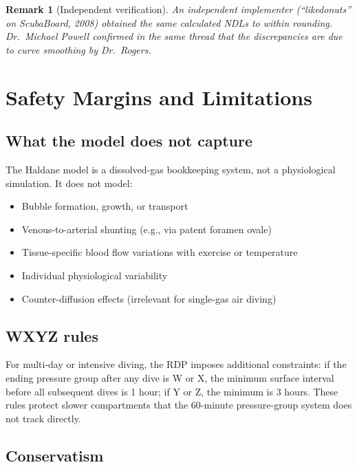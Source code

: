\documentclass[11pt,letterpaper]{article}
\newtheorem{remark}{Remark}
\begin{document}
\begin{remark}[Independent verification]
An independent implementer (``likedonuts'' on ScubaBoard, 2008) obtained
the same calculated NDLs to within rounding.  Dr.~Michael Powell confirmed
in the same thread that the discrepancies are due to curve smoothing by
Dr.~Rogers.
\end{remark}


\section{Safety Margins and Limitations}

\subsection{What the model does not capture}

The Haldane model is a dissolved-gas bookkeeping system, not a physiological
simulation.  It does not model:
\begin{itemize}[nosep]
  \item Bubble formation, growth, or transport
  \item Venous-to-arterial shunting (e.g., via patent foramen ovale)
  \item Tissue-specific blood flow variations with exercise or temperature
  \item Individual physiological variability
  \item Counter-diffusion effects (irrelevant for single-gas air diving)
\end{itemize}

\subsection{WXYZ rules}

For multi-day or intensive diving, the RDP imposes additional constraints:
if the ending pressure group after any dive is W or X, the minimum surface
interval before all subsequent dives is 1 hour; if Y or Z, the minimum
is 3 hours.  These rules protect slower compartments that the 60-minute
pressure-group system does not track directly.

\subsection{Conservatism}
\end{document}
